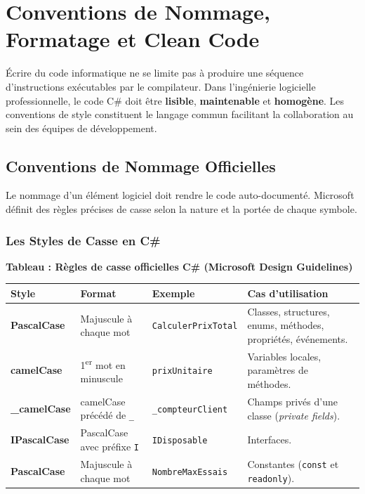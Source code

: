 
\section{Conventions de Nommage, Formatage et Clean Code}

Écrire du code informatique ne se limite pas à produire une séquence d'instructions exécutables par le compilateur. Dans l'ingénierie logicielle professionnelle, le code C\# doit être \textbf{lisible}, \textbf{maintenable} et \textbf{homogène}. Les conventions de style constituent le langage commun facilitant la collaboration au sein des équipes de développement.



\subsection{Conventions de Nommage Officielles}

Le nommage d'un élément logiciel doit rendre le code auto-documenté. Microsoft définit des règles précises de casse selon la nature et la portée de chaque symbole.

\subsubsection{Les Styles de Casse en C\#}

\begin{center}
    \textbf{Tableau : Règles de casse officielles C\# (Microsoft Design Guidelines)} \\[0.3cm]
    \begin{tabular}{@{}lllp{6cm}@{}}
        \toprule
        \textbf{Style} & \textbf{Format} & \textbf{Exemple} & \textbf{Cas d'utilisation} \\
        \midrule
        \textbf{PascalCase} & Majuscule à chaque mot & \texttt{CalculerPrixTotal} & Classes, structures, enums, méthodes, propriétés, événements. \\
        \textbf{camelCase} & 1\textsuperscript{er} mot en minuscule & \texttt{prixUnitaire} & Variables locales, paramètres de méthodes. \\
        \textbf{\_camelCase} & camelCase précédé de \texttt{\_} & \texttt{\_compteurClient} & Champs privés d'une classe (\emph{private fields}). \\
        \textbf{IPascalCase} & PascalCase avec préfixe \texttt{I} & \texttt{IDisposable} & Interfaces. \\
        \textbf{PascalCase} & Majuscule à chaque mot & \texttt{NombreMaxEssais} & Constantes (\texttt{const} et \texttt{readonly}). \\
        \bottomrule
    \end{tabular}
\end{center}

